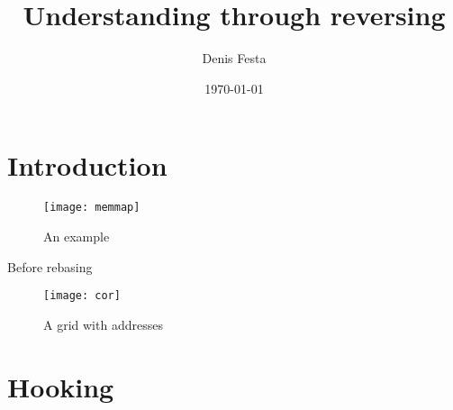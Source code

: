 \documentclass[10pt, twocolumn, a4paper]{article}
\begin{document}
\title{Understanding through reversing}
\author{Denis Festa}
\date{\today}

\maketitle

\tableofcontents

\section{Introduction}
%
%
\begin{figure}[ht]
	\centering
	\texttt{[image: memmap]}
	\caption{An example}
	\label{fig:exmemmap}
\end{figure}

Before rebasing

\begin{figure}[ht]
	\centering
	\texttt{[image: cor]}
	\caption{A grid with addresses}
	\label{fig:cor}
\end{figure}



\section{Hooking}


\end{document}
